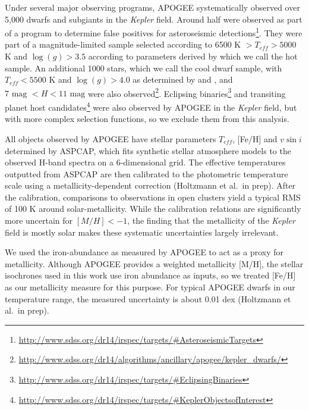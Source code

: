 \documentclass[manuscript]{aastex6}
\newcommand{\vsini}{\ensuremath{v \sin i}}
\newcommand{\Kepler}{\mbox{\textit{Kepler}}}
\newcommand{\Teff}{\ensuremath{T_{eff}}}
\newcommand{\logg}{\ensuremath{\log(g)}}
\begin{document}
Under several major observing programs, APOGEE systematically observed over 
5,000 dwarfs and subgiants in the \Kepler{} field. Around half were
observed as part of a program to determine false positives for
asteroseismic
detections\footnote{\url{http://www.sdss.org/dr14/irspec/targets/\#AsteroseismicTargets}}. 
They were part of a magnitude-limited sample
selected according to 6500 K \(> \Teff > 5000\) K and \(\logg > 3.5\)
according to parameters derived by \citet{Huber14} \citep{Zasowski17}
which we call the hot sample. An additional 
1000 stars, which we call the cool dwarf sample, with \(\Teff < 5500\) K and 
\(\logg > 4.0\) as determined by \citet{Pinsonneault12} and \citet{Brown11},
and \(7 \textrm{ mag } < H < 11 \textrm{ mag}\) were also 
observed\footnote{\url{http://www.sdss.org/dr14/algorithms/ancillary/apogee/kepler_dwarfs/}}. 
Eclipsing
binaries\footnote{\url{http://www.sdss.org/dr14/irspec/targets/\#EclipsingBinaries}} 
and transiting planet host 
candidates\footnote{\url{http://www.sdss.org/dr14/irspec/targets/\#KeplerObjectsofInterest}} 
were also observed 
by APOGEE in the \Kepler{} field, but with more complex selection functions, 
so we exclude them from this analysis.

All objects observed by APOGEE have stellar parameters \Teff{},
[Fe/H] and \vsini{} determined by ASPCAP, which fits synthetic stellar atmosphere
models to the observed H-band spectra on a 6-dimensional grid. The
effective temperatures outputted from ASPCAP are then calibrated to the
\citep{GonzalezHernandez09} photometric temperature scale using a
metallicity-dependent correction (Holtzmann et al.\ in prep). After the
calibration, comparisons to observations in open clusters yield a
typical RMS of 100 K around solar-metallicity. While the calibration
relations are significantly more uncertain for \([M/H] < -1\), the
finding that the metallicity of the \Kepler{} field is mostly solar
makes these systematic uncertainties largely irrelevant.

We used the iron-abundance as measured by APOGEE to act as a proxy for
metallicity. Although APOGEE provides a weighted metallicity [M/H], the 
stellar isochrones used in this work use iron abundance as inputs, so we 
treated [Fe/H] as our metallicity measure for this purpose. For typical APOGEE 
dwarfs in our temperature range, the measured uncertainty is about 0.01
dex (Holtzmann et al.\ in prep).
\end{document}
